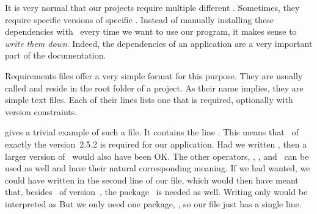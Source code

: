 %
%
\label{sec:requirementsFiles}%
%
%
%
%
%
%
%
It is very normal that our projects require multiple different .
Sometimes, they require specific versions of specific .
Instead of manually installing these dependencies with \pip\ every time we want to use our program, it makes sense to \emph{write them down}.
Indeed, the dependencies of an application are a very important part of the documentation.%
%
\begin{sloppypar}%
Requirements files offer a very simple format for this purpose.
They are usually called  and reside in the root folder of a project.
As their name implies, they are simple text files.
Each of their lines lists one  that is required, optionally with version constraints.%
\end{sloppypar}%
%
 gives a trivial example of such a file.
It contains the line .
This means that \numpy\ of exactly the version~2.5.2 is required for our application.
Had we written , then a larger version of \numpy\ would also have been OK.
The other operators, \textil{>}, \textil{<}, and~\textil{<=} can be used as well and have their natural corresponding meaning.
If we had wanted, we could have written  in the second line of our  file, which would then have meant that, besides \numpy\ of version~, the package \matplotlib\ is needed as well.
Writing only  would be interpreted as 
But we only need one package, \numpy, so our file just has a single line.

